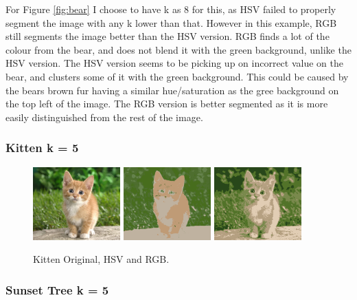 \documentclass{article}
\begin{document}
For Figure \ref{fig:bear} I choose to have k as 8 for this, as HSV failed to
properly segment the image with any k lower than that. However in this example,
RGB still segments the image better than the HSV version. RGB finds a lot of the
colour from the bear, and does not blend it with the green background, unlike
the HSV version. The HSV version seems to be picking up on incorrect value on
the bear, and clusters some of it with the green background. This could be
caused by the bears brown fur having a similar hue/saturation as the gree
background on the top left of the image. The RGB version is better segmented as
it is more easily distinguished from the rest of the image.

\subsubsection{Kitten k = 5}

\begin{figure}[ht]
\begin{center}
\includegraphics[width=0.3\textwidth]{images/kitten}
\includegraphics[width=0.3\textwidth]{images/hsv_5_kitten}
\includegraphics[width=0.3\textwidth]{images/rgb_5_kitten}
\caption{Kitten Original, HSV and RGB.}
\label{fig:kitten}
\end{center}
\end{figure}

\subsubsection{Sunset Tree k = 5}
\end{document}
